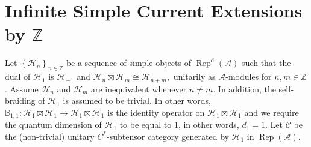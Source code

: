 \documentclass{article}
\newcommand{\hilb}{\mathcal{H}}
\newcommand{\A}{\mathcal{A}}
\newcommand{\Z}{\mathbb{Z}}
\begin{document}
\section{Infinite Simple Current Extensions by $\Z$}
Let $\left\{\hilb_n\right\}_{n\in\Z}$ be a sequence of  simple objects of $\operatorname{Rep}^{\operatorname{d}}(\A)$ such that the dual of $\hilb_1$ is $\hilb_{-1}$ and 
$\hilb_n \boxtimes \hilb_m \cong \hilb_{n+m}, $ unitarily as $\A$-modules for $n,m\in\Z$. Assume $\hilb_{n} $ and $\hilb_{m}$ are inequivalent whenever $n\neq m$. 
In addition, the self-braiding of $\hilb_1$ is assumed to be trivial. In other words, $\mathbb{B}_{1,1}: \hilb_1 \boxtimes \hilb_1\to \hilb_1\boxtimes \hilb_1  $ is the identity operator on $\hilb_1 \boxtimes \hilb_1$ and we require the quantum dimension of $\hilb_1$ to be equal to $1$, in other words, $d_1 =1 $. 
Let $\mathcal{C}$ be the (non-trivial) unitary $C^*$-subtensor category generated by $\hilb_1$ in $\operatorname{Rep}(\A)$. 
\end{document}
